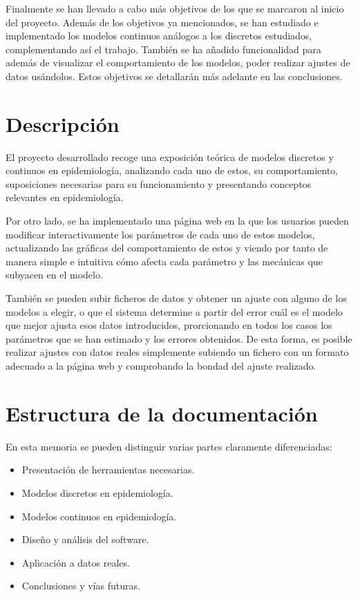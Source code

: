 Finalmente se han llevado a cabo más objetivos de los que se marcaron al inicio del proyecto. Además de los objetivos ya mencionados, se han estudiado e implementado los modelos continuos análogos a los discretos estudiados, complementando así el trabajo. También se ha añadido funcionalidad para además de visualizar el comportamiento de los modelos, poder realizar ajustes de datos usándolos. Estos objetivos se detallarán más adelante en las conclusiones.


\section{Descripción}

El proyecto desarrollado recoge una exposición teórica de modelos discretos y continuos en epidemiología, analizando cada uno de estos, su comportamiento, suposiciones necesarias para su funcionamiento y presentando conceptos relevantes en epidemiología.

Por otro lado, se ha implementado una página web en la que los usuarios pueden modificar interactivamente los parámetros de cada uno de estos modelos, actualizando las gráficas del comportamiento de estos y viendo por tanto de manera simple e intuitiva cómo afecta cada parámetro y las mecánicas que subyacen en el modelo.

También se pueden subir ficheros de datos y obtener un ajuste con alguno de los modelos a elegir, o que el sistema determine a partir del error cuál es el modelo que mejor ajusta esos datos introducidos, prorcionando en todos los casos los parámetros que se han estimado y los errores obtenidos. De esta forma, es posible realizar ajustes con datos reales simplemente subiendo un fichero con un formato adecuado a la página web y comprobando la bondad del ajuste realizado.


\section{Estructura de la documentación}

En esta memoria se pueden distinguir varias partes claramente diferenciadas:

\begin{itemize}
\item Presentación de herramientas necesarias.
\item Modelos discretos en epidemiología.
\item Modelos continuos en epidemiología.
\item Diseño y análisis del software.
\item Aplicación a datos reales.
\item Conclusiones y vías futuras.
\end{itemize}


